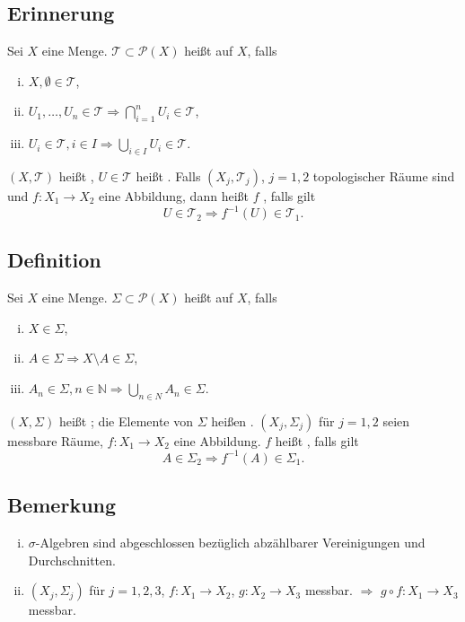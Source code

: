 \subsection[Erinnerung: Topologien, Stetigkeit in topologischen Räumen]{Erinnerung} %
\label{sub:91}
Sei $X$ eine Menge. $\mathcal{T} \subset \mathcal{P}(X)$ heißt  auf $X$, falls 
\begin{enumerate}[(i)]
	\item $X, \emptyset \in \mathcal{T} $,
	\item $U_1, \ldots , U_n \in \mathcal{T} \Longrightarrow  \bigcap_{i=1}^n U_i \in \mathcal{T} $,
	\item $U_i \in \mathcal{T}, i \in I \Longrightarrow \bigcup_{i \in I} U_i \in \mathcal{T} $.
\end{enumerate} 
$(X,\mathcal{T})$ heißt , $U \in \mathcal{T} $ heißt . Falls $(X_j, \mathcal{T}_j)$, $j=1,2$ topologischer Räume sind und
$f : X_1 \to X_2$ eine Abbildung, dann heißt $f$ , falls gilt
\[
	U \in \mathcal{T}_2 \Longrightarrow  f ^{-1} (U) \in \mathcal{T}_1.
\] 

\subsection[Definition: $\sigma$-Algebra, messbarer Raum]{Definition} %
\label{sub:92}
Sei $X$ eine Menge. $\Sigma  \subset \mathcal{P}(X)$ heißt  auf $X$, falls 
\begin{enumerate}[(i)]
	\item $X \in \Sigma$,
	\item $A \in \Sigma \Rightarrow X \setminus A \in \Sigma$,
	\item $A_n \in \Sigma, n \in \mathds{N} \Rightarrow \bigcup_{n \in N} A_n \in \Sigma$.
\end{enumerate}
$(X, \Sigma)$ heißt ; die Elemente von $\Sigma$ heißen .  $(X_j, \Sigma_j)$ für $ j=1,2$ seien messbare Räume,
$f : X_1 \to X_2$ eine Abbildung. $f$ heißt , falls gilt
\[
	A \in \Sigma_2 \Longrightarrow f ^{-1}(A) \in \Sigma_1.
\]

\subsection[Bemerkung: Schnitte und Komposition messbaren Abbildungen in $\sigma$-Algebren]{Bemerkung} %
\label{sub:93}
\begin{enumerate}[(i)]
	\item $\sigma$-Algebren sind abgeschlossen bezüglich abzählbarer Vereinigungen und Durchschnitten. 
	\item $(X_j, \Sigma_j)$ für $j=1,2,3$, $f : X_1 \to X_2$, $g : X_2 \to X_3$ messbar. $\Rightarrow $ 
	$g \circ f : X_1 \to X_3$ messbar.
\end{enumerate}

